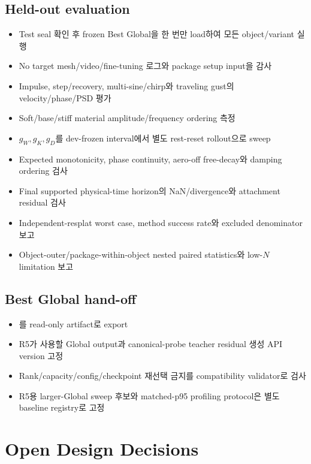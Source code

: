 \documentclass[10pt,a4paper]{article}
\begin{document}
\subsection{Held-out evaluation}

\begin{itemize}
  \item[$\square$] Test seal 확인 후 frozen Best Global을 한 번만 load하여 모든 object/variant 실행
  \item[$\square$] No target mesh/video/fine-tuning 로그와 package setup input을 감사
  \item[$\square$] Impulse, step/recovery, multi-sine/chirp와 traveling gust의 velocity/phase/PSD 평가
  \item[$\square$] Soft/base/stiff material amplitude/frequency ordering 측정
  \item[$\square$] \(g_W,g_K,g_D\)를 dev-frozen interval에서 별도 rest-reset rollout으로 sweep
  \item[$\square$] Expected monotonicity, phase continuity, aero-off free-decay와 damping ordering 검사
  \item[$\square$] Final supported physical-time horizon의 NaN/divergence와 attachment residual 검사
  \item[$\square$] Independent-resplat worst case, method success rate와 excluded denominator 보고
  \item[$\square$] Object-outer/package-within-object nested paired statistics와 low-\(N\) limitation 보고
\end{itemize}

\subsection{Best Global hand-off}

\begin{itemize}
  \item[$\square$] 를 read-only artifact로 export
  \item[$\square$] R5가 사용할 Global output과 canonical-probe teacher residual 생성 API version 고정
  \item[$\square$] Rank/capacity/config/checkpoint 재선택 금지를 compatibility validator로 검사
  \item[$\square$] R5용 larger-Global sweep 후보와 matched-p95 profiling protocol은 별도 baseline registry로 고정
\end{itemize}

\section{Open Design Decisions}
\label{sec:r4-chapter-5}
\end{document}
